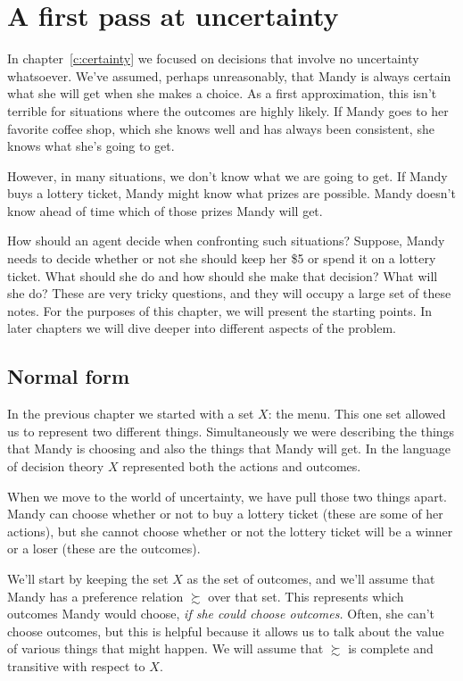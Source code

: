 \chapter{A first pass at uncertainty}
\label{c:uncertainty-noprob}

In chapter~\ref{c:certainty} we focused on decisions that involve no uncertainty whatsoever.  We've assumed, perhaps unreasonably, that Mandy is always certain what she will get when she makes a choice.  As a first approximation, this isn't terrible for situations where the outcomes are highly likely.  If Mandy goes to her favorite coffee shop, which she knows well and has always been consistent, she knows what she's going to get.

However, in many situations, we don't know what we are going to get. If Mandy buys a lottery ticket, Mandy might know what prizes are possible. Mandy doesn't know ahead of time which of those prizes Mandy will get.

How should an agent decide when confronting such situations?  Suppose, Mandy needs to decide whether or not she should keep her \$5 or spend it on a lottery ticket. What should she do and how should she make that decision?  What will she do?  These are very tricky questions, and they will occupy a large set of these notes. For the purposes of this chapter, we will present the starting points. In later chapters we will dive deeper into different aspects of the problem.

\section{Normal form}

In the previous chapter we started with a set $X$: the menu.  This one set allowed us to represent two different things. Simultaneously we were describing the things that Mandy is choosing and also the things that Mandy will get.  In the language of decision theory $X$ represented both the actions and outcomes.  

When we move to the world of uncertainty, we have pull those two things apart.  Mandy can choose whether or not to buy a lottery ticket (these are some of her actions), but she cannot choose whether or not the lottery ticket will be a winner or a loser (these are the outcomes).

We'll start by keeping the set $X$ as the set of outcomes, and we'll assume that Mandy has a preference relation $\succsim$ over that set.  This represents which outcomes Mandy would choose, {\it if she could choose outcomes.}  Often, she can't choose outcomes, but this is helpful because it allows us to talk about the value of various things that might happen. We will assume that $\succsim$ is complete and transitive with respect to $X$.

